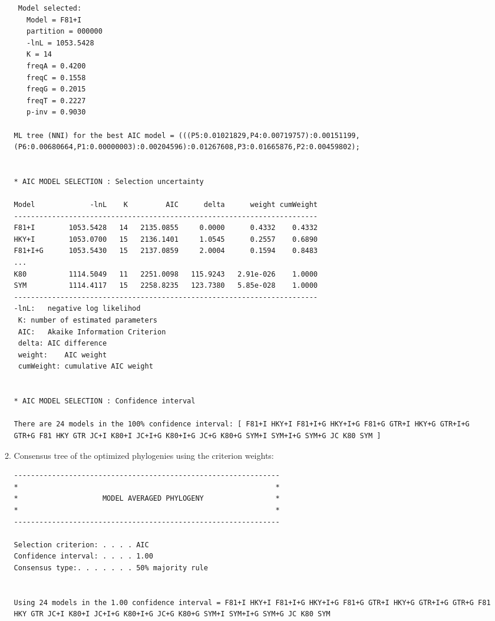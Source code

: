 \documentclass[11pt,twoside,a4paper]{article}
\begin{document}
\begin{enumerate}
\begin{enumerate}
\begin{lstlisting}
 Model selected: 
   Model = F81+I
   partition = 000000
   -lnL = 1053.5428
   K = 14
   freqA = 0.4200 
   freqC = 0.1558 
   freqG = 0.2015 
   freqT = 0.2227 
   p-inv = 0.9030 
 
ML tree (NNI) for the best AIC model = (((P5:0.01021829,P4:0.00719757):0.00151199,(P6:0.00680664,P1:0.00000003):0.00204596):0.01267608,P3:0.01665876,P2:0.00459802);
 
 
* AIC MODEL SELECTION : Selection uncertainty
 
Model             -lnL    K         AIC      delta      weight cumWeight
------------------------------------------------------------------------ 
F81+I        1053.5428   14   2135.0855     0.0000      0.4332    0.4332 
HKY+I        1053.0700   15   2136.1401     1.0545      0.2557    0.6890 
F81+I+G      1053.5430   15   2137.0859     2.0004      0.1594    0.8483
...
K80          1114.5049   11   2251.0098   115.9243   2.91e-026    1.0000 
SYM          1114.4117   15   2258.8235   123.7380   5.85e-028    1.0000
------------------------------------------------------------------------
-lnL:	negative log likelihod
 K:	number of estimated parameters
 AIC:	Akaike Information Criterion
 delta:	AIC difference
 weight:	AIC weight
 cumWeight:	cumulative AIC weight
 
 
* AIC MODEL SELECTION : Confidence interval
 
There are 24 models in the 100% confidence interval: [ F81+I HKY+I F81+I+G HKY+I+G F81+G GTR+I HKY+G GTR+I+G GTR+G F81 HKY GTR JC+I K80+I JC+I+G K80+I+G JC+G K80+G SYM+I SYM+I+G SYM+G JC K80 SYM ] 
\end{lstlisting}

\item Consensus tree of the optimized phylogenies using the criterion weights:
 
\begin{lstlisting}
---------------------------------------------------------------
*                                                             *
*                    MODEL AVERAGED PHYLOGENY                 *
*                                                             *
---------------------------------------------------------------
 
Selection criterion: . . . . AIC
Confidence interval: . . . . 1.00
Consensus type:. . . . . . . 50% majority rule
 
 
Using 24 models in the 1.00 confidence interval = F81+I HKY+I F81+I+G HKY+I+G F81+G GTR+I HKY+G GTR+I+G GTR+G F81 HKY GTR JC+I K80+I JC+I+G K80+I+G JC+G K80+G SYM+I SYM+I+G SYM+G JC K80 SYM  


\end{lstlisting}
\end{enumerate}
\end{enumerate}
\end{document}
